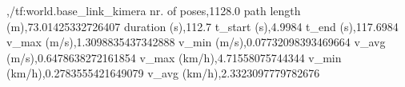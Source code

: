 ,/tf:world.base_link_kimera
nr. of poses,1128.0
path length (m),73.01425332726407
duration (s),112.7
t_start (s),4.9984
t_end (s),117.6984
v_max (m/s),1.3098835437342888
v_min (m/s),0.07732098393469664
v_avg (m/s),0.6478638272161854
v_max (km/h),4.71558075744344
v_min (km/h),0.2783555421649079
v_avg (km/h),2.3323097779782676
